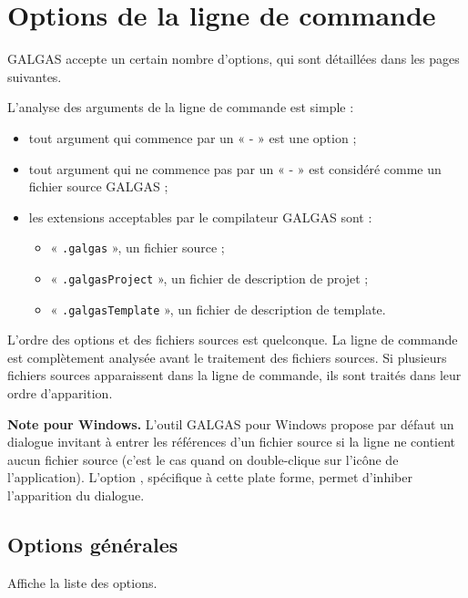 
\chapter{Options de la ligne de commande}

GALGAS accepte un certain nombre d’options, qui sont détaillées dans les pages suivantes.

L’analyse des arguments de la ligne de commande est simple :
\begin{itemize}
  \item tout argument qui commence par un « - » est une option ;
  \item tout argument qui ne commence pas par un « - » est considéré comme un fichier source GALGAS ;
  \item les extensions acceptables par le compilateur GALGAS sont :
  \begin{itemize}
    \item « \texttt{.galgas} », un fichier source ;
    \item « \texttt{.galgasProject} », un fichier de description de projet ;
    \item « \texttt{.galgasTemplate} », un fichier de description de template.
  \end{itemize}
\end{itemize}

L’ordre des options et des fichiers sources est quelconque. La ligne de commande est complètement analysée avant le traitement des fichiers sources. Si plusieurs fichiers sources apparaissent dans la ligne de commande, ils sont traités dans leur ordre d’apparition.

{\bf Note pour Windows.} L’outil GALGAS pour Windows propose par défaut un dialogue invitant à entrer les références d’un fichier source si la ligne ne contient aucun fichier source (c’est le cas quand on double-clique sur l’icône de l’application). L'option , spécifique à cette plate forme, permet d'inhiber l’apparition du dialogue.

\section{Options générales}

 Affiche la liste des options.

